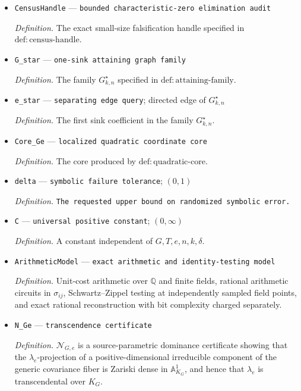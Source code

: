 \documentclass{article}
\begin{document}
\begin{itemize}
  \item \texttt{CensusHandle} --- \texttt{bounded characteristic-\allowbreak{}zero elimination audit}
  \par\smallskip\noindent\emph{Definition.} The exact small-size falsification handle specified in \(\mathrm{def:census\mbox{-}handle}\).
  \item \texttt{G\_\allowbreak{}star} --- \texttt{one-\allowbreak{}sink attaining graph family}
  \par\smallskip\noindent\emph{Definition.} The family \(G^{\star}_{k,n}\) specified in \(\mathrm{def:attaining\mbox{-}family}\).
  \item \texttt{e\_\allowbreak{}star} --- \texttt{separating edge query}; directed edge of \(G^{\star}_{k,n}\)
  \par\smallskip\noindent\emph{Definition.} The first sink coefficient in the family \(G^{\star}_{k,n}\).
  \item \texttt{Core\_\allowbreak{}Ge} --- \texttt{localized quadratic coordinate core}
  \par\smallskip\noindent\emph{Definition.} The core produced by \(\mathrm{def:quadratic\mbox{-}core}\).
  \item \texttt{delta} --- \texttt{symbolic failure tolerance}; \((0,1)\)
  \par\smallskip\noindent\emph{Definition.} \texttt{The requested upper bound on randomized symbolic error.}
  \item \texttt{C} --- \texttt{universal positive constant}; \((0,\infty)\)
  \par\smallskip\noindent\emph{Definition.} A constant independent of \(G,T,e,n,k,\delta\).
  \item \texttt{ArithmeticModel} --- \texttt{exact arithmetic and identity-\allowbreak{}testing model}
  \par\smallskip\noindent\emph{Definition.} Unit-cost arithmetic over \(\mathbb Q\) and finite fields, rational arithmetic circuits in \(\sigma_{ij}\), Schwartz--Zippel testing at independently sampled field points, and exact rational reconstruction with bit complexity charged separately.
  \item \texttt{N\_\allowbreak{}Ge} --- \texttt{transcendence certificate}
  \par\smallskip\noindent\emph{Definition.} \(\mathcal N_{G,e}\) is a source-parametric dominance certificate showing that the \(\lambda_e\)-projection of a positive-dimensional irreducible component of the generic covariance fiber is Zariski dense in \(\mathbb A^1_{K_G}\), and hence that \(\lambda_e\) is transcendental over \(K_G\).

\end{itemize}
\end{document}
